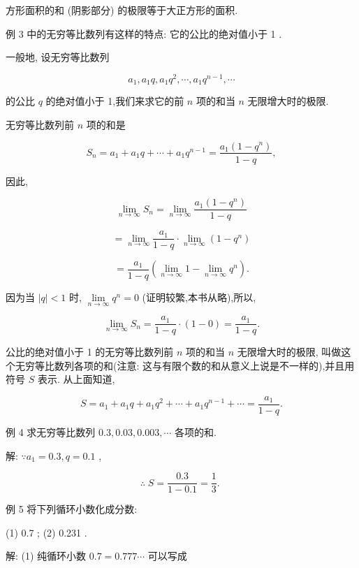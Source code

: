\documentclass[lang=cn,newtx,10pt,scheme=chinese]{elegantbook}
\begin{document}
方形面积的和 (阴影部分) 的极限等于大正方形的面积.

例 3 中的无穷等比数列有这样的特点: 它的公比的绝对值小于 1 .

一般地, 设无穷等比数列

\[
{a}_{1},{a}_{1}q,{a}_{1}{q}^{2},\cdots ,{a}_{1}{q}^{n - 1},\cdots
\]

的公比 \(q\) 的绝对值小于 1,我们来求它的前 \(n\) 项的和当 \(n\) 无限增大时的极限.

无穷等比数列前 \(n\) 项的和是

\[
{S}_{n} = {a}_{1} + {a}_{1}q + \cdots + {a}_{1}{q}^{n - 1} = \frac{{a}_{1}\left( {1 - {q}^{n}}\right) }{1 - q},
\]

因此,

\[
\mathop{\lim }\limits_{{n \rightarrow \infty }}{S}_{n} = \mathop{\lim }\limits_{{n \rightarrow \infty }}\frac{{a}_{1}\left( {1 - {q}^{n}}\right) }{1 - q}
\]

\[
= \mathop{\lim }\limits_{{n \rightarrow \infty }}\frac{{a}_{1}}{1 - q} \cdot \mathop{\lim }\limits_{{n \rightarrow \infty }}\left( {1 - {q}^{n}}\right)
\]

\[
= \frac{{a}_{1}}{1 - q}\left( {\mathop{\lim }\limits_{{n \rightarrow \infty }}1 - \mathop{\lim }\limits_{{n \rightarrow \infty }}{q}^{n}}\right) .
\]

因为当 \(\left| q\right| < 1\) 时, \(\mathop{\lim }\limits_{{n \rightarrow \infty }}{q}^{n} = 0\) (证明较繁,本书从略),所以,

\[
\mathop{\lim }\limits_{{n \rightarrow \infty }}{S}_{n} = \frac{{a}_{1}}{1 - q} \cdot \left( {1 - 0}\right) = \frac{{a}_{1}}{1 - q}.
\]

公比的绝对值小于 1 的无穷等比数列前 \(n\) 项的和当 \(n\) 无限增大时的极限, 叫做这个无穷等比数列各项的和(注意: 这与有限个数的和从意义上说是不一样的),并且用符号 \(S\) 表示. 从上面知道,

\[
S = {a}_{1} + {a}_{1}q + {a}_{1}{q}^{2} + \cdots + {a}_{1}{q}^{n - 1} + \cdots = \frac{{a}_{1}}{1 - q}.
\]

例 4 求无穷等比数列 \({0.3},{0.03},{0.003},\cdots\) 各项的和.

解: \(\because {a}_{1} = {0.3},q = {0.1}\) ,

\[
\therefore \;S = \frac{0.3}{1 - {0.1}} = \frac{1}{3}\text{. }
\]

例 5 将下列循环小数化成分数:

(1) 0.7 ; (2) 0.231 .

解: (1) 纯循环小数 \({0.7} = {0.777}\cdots\) 可以写成
\end{document}
